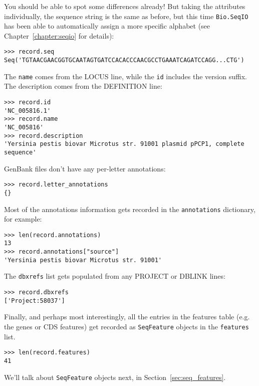 You should be able to spot some differences already! But taking the attributes individually,
the sequence string is the same as before, but this time \verb|Bio.SeqIO| has been able to automatically assign a more specific alphabet (see Chapter~\ref{chapter:seqio} for details):

\begin{verbatim}
>>> record.seq
Seq('TGTAACGAACGGTGCAATAGTGATCCACACCCAACGCCTGAAATCAGATCCAGG...CTG')
\end{verbatim}

The \verb|name| comes from the LOCUS line, while the \verb|id| includes the version suffix.
The description comes from the DEFINITION line:

\begin{verbatim}
>>> record.id
'NC_005816.1'
>>> record.name
'NC_005816'
>>> record.description
'Yersinia pestis biovar Microtus str. 91001 plasmid pPCP1, complete sequence'
\end{verbatim}

GenBank files don't have any per-letter annotations:

\begin{verbatim}
>>> record.letter_annotations
{}
\end{verbatim}

Most of the annotations information gets recorded in the \verb|annotations| dictionary, for example:

\begin{verbatim}
>>> len(record.annotations)
13
>>> record.annotations["source"]
'Yersinia pestis biovar Microtus str. 91001'
\end{verbatim}

The \verb|dbxrefs| list gets populated from any PROJECT or DBLINK lines:

\begin{verbatim}
>>> record.dbxrefs
['Project:58037']
\end{verbatim}

Finally, and perhaps most interestingly, all the entries in the features table (e.g. the genes or CDS features) get recorded as \verb|SeqFeature| objects in the \verb|features| list.

\begin{verbatim}
>>> len(record.features)
41
\end{verbatim}

\noindent We'll talk about \verb|SeqFeature| objects next, in
Section~\ref{sec:seq_features}.

